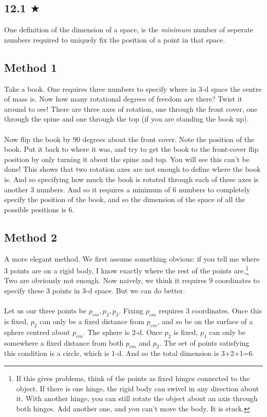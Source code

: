 

\subsection{12.1 $\bigstar$}
One definition of the dimension of a space, is the \emph{minimum} number of seperate numbers required to uniquely fix the position of a point in that space. 
\subsection*{Method 1}
Take a book. One requires three numbers to specify where in 3-d space the centre of mass is. Now how many rotational degrees of freedom are there? Twist it around to see! There are three axes of rotation, one through the front cover, one through the spine and one through the top (if you are standing the book up).\\ \\ Now flip the book by 90 degrees about the front cover. Note the position of the book. Put it back to where it was, and try to get the book to the front-cover flip position by only turning it about the spine and top. You will see this can't be done! This shows that two rotation axes are not enough to define where the book is. And so specifying how much the book is rotated through each of these axes is another 3 numbers. And so it requires a minimum of 6 numbers to completely specify the position of the book, and so the dimension of the space of all the possible positions is 6. 

\subsection*{Method 2} 
A more elegant method. We first assume something obvious: if you tell me where 3 points are on a rigid body, I know exactly where the rest of the points are.\footnote{If this gives problems, think of the points as fixed hinges connected to the object. If there is one hinge, the rigid body can swivel in any direction about it. With another hinge, you can still rotate the object about an axis through both hinges. Add another one, and you can't move the body. It is stuck. } Two are obviously not enough. Now naively, we think it requires 9 coordinates to specify these 3 points in 3-d space. But we can do better. \\ \\ Let us our three points be $p_{cm}, p_2, p_3$. Fixing $p_{cm}$ requires 3 coordinates. Once this is fixed, $p_2$ can only be a fixed distance from $p_{cm}$, and so be on the surface of a sphere centred about $p_{cm}$. The sphere is 2-d. Once $p_2$ is fixed, $p_3$ can only be somewhere a fixed distance from both $p_{cm}$ and $p_2$. The set of points satisfying this condition is a circle, which is 1-d. And so the total dimension is 3+2+1=6.
